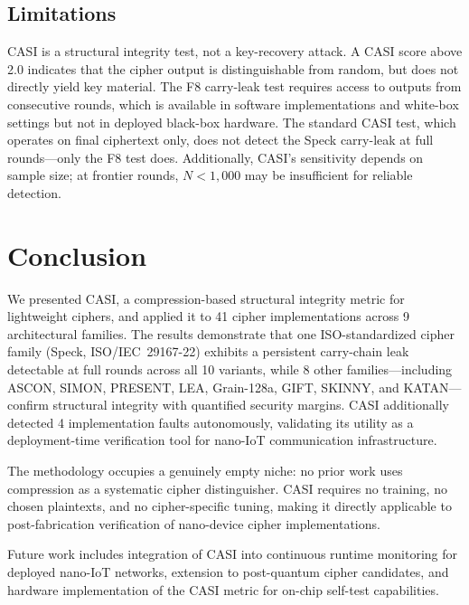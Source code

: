 \documentclass[conference]{IEEEtran}
\begin{document}
\subsection{Limitations}

CASI is a structural integrity test, not a key-recovery attack.
A CASI score above 2.0 indicates that the cipher output is distinguishable from random, but does not directly yield key material.
The F8 carry-leak test requires access to outputs from consecutive rounds, which is available in software implementations and white-box settings but not in deployed black-box hardware.
The standard CASI test, which operates on final ciphertext only, does not detect the Speck carry-leak at full rounds---only the F8 test does.
Additionally, CASI's sensitivity depends on sample size; at frontier rounds, $N < 1{,}000$ may be insufficient for reliable detection.


\section{Conclusion}
\label{sec:conclusion}

We presented CASI, a compression-based structural integrity metric for lightweight ciphers, and applied it to 41 cipher implementations across 9 architectural families.
The results demonstrate that one ISO-standardized cipher family (Speck, ISO/IEC~29167-22) exhibits a persistent carry-chain leak detectable at full rounds across all 10 variants, while 8 other families---including ASCON, SIMON, PRESENT, LEA, Grain-128a, GIFT, SKINNY, and KATAN---confirm structural integrity with quantified security margins.
CASI additionally detected 4 implementation faults autonomously, validating its utility as a deployment-time verification tool for nano-IoT communication infrastructure.

The methodology occupies a genuinely empty niche: no prior work uses compression as a systematic cipher distinguisher.
CASI requires no training, no chosen plaintexts, and no cipher-specific tuning, making it directly applicable to post-fabrication verification of nano-device cipher implementations.

Future work includes integration of CASI into continuous runtime monitoring for deployed nano-IoT networks, extension to post-quantum cipher candidates, and hardware implementation of the CASI metric for on-chip self-test capabilities.
\end{document}
